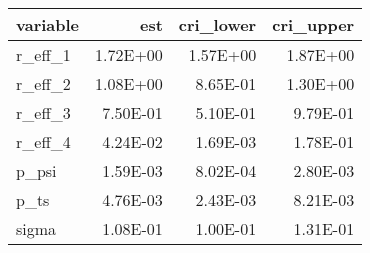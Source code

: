 \begin{table}[ht]
\centering
\begin{tabular}{lrrr}
  \hline
variable & est & cri\_lower & cri\_upper \\ 
  \hline
r\_eff\_1 & 1.72E+00 & 1.57E+00 & 1.87E+00 \\ 
  r\_eff\_2 & 1.08E+00 & 8.65E-01 & 1.30E+00 \\ 
  r\_eff\_3 & 7.50E-01 & 5.10E-01 & 9.79E-01 \\ 
  r\_eff\_4 & 4.24E-02 & 1.69E-03 & 1.78E-01 \\ 
  p\_psi & 1.59E-03 & 8.02E-04 & 2.80E-03 \\ 
  p\_ts & 4.76E-03 & 2.43E-03 & 8.21E-03 \\ 
  sigma & 1.08E-01 & 1.00E-01 & 1.31E-01 \\ 
   \hline
\end{tabular}
\end{table}
